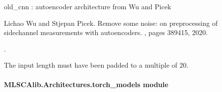 \documentclass[letterpaper,10pt,english]{sphinxmanual}
\begin{document}
\begin{fulllineitems}
\label{\detokenize{MLSCAlib.Architectures:MLSCAlib.Architectures.autoencoders.old_cnn}}
\pysigstartsignatures
{}
\pysigstopsignatures
\sphinxAtStartPar
old\_cnn : autoencoder architecture from Wu and Picek%
\begin{footnote}[1]\sphinxAtStartFootnote
Lichao Wu and Stjepan Picek. Remove some noise: on pre\sphinxhyphen{}processing of side\sphinxhyphen{}channel measurements with autoencoders. , pages 389\textendash{}415, 2020.
%
\end{footnote}.

\sphinxAtStartPar
The input length must have been padded to a multiple of 20.

\end{fulllineitems}



\paragraph{MLSCAlib.Architectures.torch\_models module}
\label{\detokenize{MLSCAlib.Architectures:module-MLSCAlib.Architectures.torch_models}}\label{\detokenize{MLSCAlib.Architectures:mlscalib-architectures-torch-models-module}}
\end{document}
